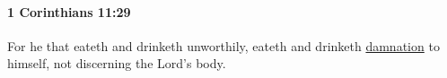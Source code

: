 			\begin{framed}
				\scriptsize
				\begin{compactdesc}
					\item[SBLG] 
				\end{compactdesc}
			\end{framed}

		\paragraph{1 Corinthians 11:29} %
			\label{1CORINTHIANS-11-29}

			For he that eateth and drinketh unworthily, eateth and drinketh \hyperref[DAMNATION]{damnation} to himself, not discerning the Lord's body.

